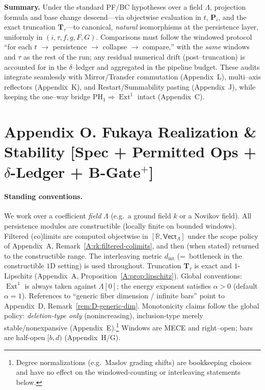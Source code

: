 \documentclass[11pt]{article}
\DeclareMathOperator{\Ext}{Ext}
\DeclareRobustCommand{\hyp}{\nobreakdash-}
\numberwithin{equation}{section}
\theoremstyle{definition}
\begin{document}
\medskip
\noindent\textbf{Summary.}
Under the standard PF/BC hypotheses over a field \(\Lambda\), projection formula and base change descend—via objectwise evaluation in \(t\), \(\mathbf{P}_i\), and the exact truncation \(\mathbf{T}_\tau\)—to canonical, \emph{natural} isomorphisms at the persistence layer, uniformly in \((i,\tau,f,g,F,G)\).
Comparisons must follow the windowed protocol “for each \(t\) \(\to\) persistence \(\to\) collapse \(\to\) compare,” with the \emph{same} windows and \(\tau\) as the rest of the run; any residual numerical drift (post–truncation) is accounted for in the \(\delta\)–ledger and aggregated in the pipeline budget.
These audits integrate seamlessly with Mirror/Transfer commutation (Appendix~L), multi–axis reflectors (Appendix~K), and Restart/Summability pasting (Appendix~J), while keeping the one–way bridge \(\mathrm{PH}_1\Rightarrow \Ext^1\) intact (Appendix~C).



\section*{Appendix O. Fukaya Realization \& Stability [Spec + Permitted Ops + $\delta$-Ledger + B-Gate$^{+}$]}
{}
\label{O:fukaya}

\paragraph{Standing conventions.}
We work over a coefficient \emph{field} \(\Lambda\) (e.g.\ a ground field \(k\) or a Novikov field).
All persistence modules are constructible (locally finite on bounded windows).
Filtered (co)limits are computed objectwise in \([\mathbb{R},\mathsf{Vect}_\Lambda]\) under the scope policy of Appendix~A, Remark~\ref{A:rk:filtered-colimits}, and then (when stated) returned to the constructible range.
The interleaving metric \(d_{\mathrm{int}}\) (=\ bottleneck in the constructible \(1\)D setting) is used throughout.
Truncation \(\mathbf{T}_\tau\) is exact and \(1\)\hyp Lipschitz (Appendix~A, Proposition~\ref{A:prop:lipschitz}).
Global conventions: \(\Ext^1\) is always taken against \(\Lambda[0]\); the energy exponent satisfies \(\alpha>0\) (default \(\alpha=1\)).
References to “generic fiber dimension / infinite bars” point to Appendix~D, Remark~\ref{rem:D-generic-dim}.
Monotonicity claims follow the global policy: \emph{deletion-type only} (nonincreasing), inclusion-type merely stable/nonexpansive (Appendix~E).\footnote{Degree normalizations (e.g.\ Maslov grading shifts) are bookkeeping choices and have no effect on the windowed-counting or interleaving statements below.}
Windows are MECE and right–open; bars are half-open \([b,d)\) (Appendix~H/G).
\end{document}
